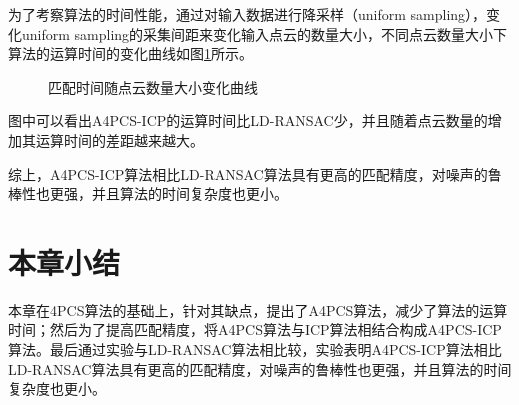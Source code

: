 为了考察算法的时间性能，通过对输入数据进行降采样（uniform sampling），变化uniform sampling的采集间距来变化输入点云的数量大小，不同点云数量大小下算法的运算时间的变化曲线如图\ref{fig:time-size}所示。
\begin{figure}[ht]
  \centering
  \caption{匹配时间随点云数量大小变化曲线}
  \label{fig:time-size}
\end{figure}
图中可以看出A4PCS-ICP的运算时间比LD-RANSAC少，并且随着点云数量的增加其运算时间的差距越来越大。

综上，A4PCS-ICP算法相比LD-RANSAC算法具有更高的匹配精度，对噪声的鲁棒性也更强，并且算法的时间复杂度也更小。

\section{本章小结}
本章在4PCS算法的基础上，针对其缺点，提出了A4PCS算法，减少了算法的运算时间；然后为了提高匹配精度，将A4PCS算法与ICP算法相结合构成A4PCS-ICP算法。最后通过实验与LD-RANSAC算法相比较，实验表明A4PCS-ICP算法相比LD-RANSAC算法具有更高的匹配精度，对噪声的鲁棒性也更强，并且算法的时间复杂度也更小。


